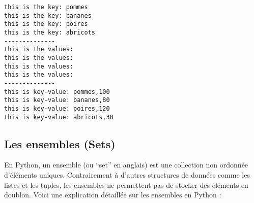 \documentclass[11pt]{article}
\begin{document}
    \begin{Verbatim}[commandchars=\\\{\}]
this is the key: pommes
this is the key: bananes
this is the key: poires
this is the key: abricots
--------------
this is the values:
this is the values:
this is the values:
this is the values:
--------------
this is key-value: pommes,100
this is key-value: bananes,80
this is key-value: poires,120
this is key-value: abricots,30
    \end{Verbatim}

    \hypertarget{les-ensembles-sets}{%
\subsection{Les ensembles (Sets)}\label{les-ensembles-sets}}

En Python, un ensemble (ou ``set'' en anglais) est une collection non
ordonnée d'éléments uniques. Contrairement à d'autres structures de
données comme les listes et les tuples, les ensembles ne permettent pas
de stocker des éléments en doublon. Voici une explication détaillée sur
les ensembles en Python :
\end{document}
